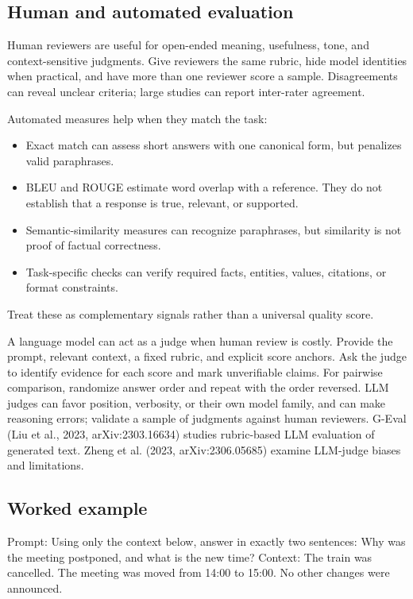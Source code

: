 \documentclass[a4paper]{article}
\begin{document}
   \subsection{Human and automated evaluation}
   Human reviewers are useful for open-ended meaning, usefulness, tone, and
   context-sensitive judgments. Give reviewers the same rubric, hide model
   identities when practical, and have more than one reviewer score a sample.
   Disagreements can reveal unclear criteria; large studies can report
   inter-rater agreement.

   Automated measures help when they match the task:
   \begin{itemize}
      \item Exact match can assess short answers with one canonical form, but
      penalizes valid paraphrases.
      \item BLEU and ROUGE estimate word overlap with a reference. They do not
      establish that a response is true, relevant, or supported.
      \item Semantic-similarity measures can recognize paraphrases, but
      similarity is not proof of factual correctness.
      \item Task-specific checks can verify required facts, entities, values,
      citations, or format constraints.
   \end{itemize}
   Treat these as complementary signals rather than a universal quality score.

   A language model can act as a judge when human review is costly. Provide the
   prompt, relevant context, a fixed rubric, and explicit score anchors. Ask
   the judge to identify evidence for each score and mark unverifiable claims.
   For pairwise comparison, randomize answer order and repeat with the order
   reversed. LLM judges can favor position, verbosity, or their own model
   family, and can make reasoning errors; validate a sample of judgments
   against human reviewers. G-Eval (Liu et al., 2023, arXiv:2303.16634)
   studies rubric-based LLM evaluation of generated text. Zheng et al. (2023,
   arXiv:2306.05685) examine LLM-judge biases and limitations.

   \subsection{Worked example}
   Prompt: Using only the context below, answer in exactly two sentences:
   Why was the meeting postponed, and what is the new time? Context: The train
   was cancelled. The meeting was moved from 14:00 to 15:00. No other changes
   were announced.
\end{document}
